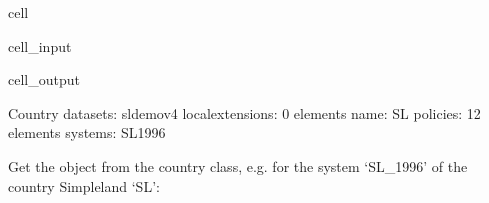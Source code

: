 \documentclass[letterpaper,10pt,english]{sphinxmanual}
\begin{document}
\begin{sphinxuseclass}{cell}
\begin{sphinxuseclass}{cell_input}
\begin{sphinxVerbatim}[commandchars=\\\{\}]
\PYG{p}{[}\PYG{p}{]}
\end{sphinxVerbatim}

\end{sphinxuseclass}
\begin{sphinxuseclass}{cell_output}
\begin{sphinxVerbatim}[commandchars=\\\{\}]
\PYGZhy{}\PYGZhy{}\PYGZhy{}\PYGZhy{}\PYGZhy{}\PYGZhy{}\PYGZhy{}\PYGZhy{}\PYGZhy{}\PYGZhy{}\PYGZhy{}\PYGZhy{}\PYGZhy{}\PYGZhy{}\PYGZhy{}\PYGZhy{}\PYGZhy{}\PYGZhy{}\PYGZhy{}\PYGZhy{}\PYGZhy{}\PYGZhy{}\PYGZhy{}\PYGZhy{}\PYGZhy{}\PYGZhy{}\PYGZhy{}\PYGZhy{}\PYGZhy{}\PYGZhy{}
Country
\PYGZhy{}\PYGZhy{}\PYGZhy{}\PYGZhy{}\PYGZhy{}\PYGZhy{}\PYGZhy{}\PYGZhy{}\PYGZhy{}\PYGZhy{}\PYGZhy{}\PYGZhy{}\PYGZhy{}\PYGZhy{}\PYGZhy{}\PYGZhy{}\PYGZhy{}\PYGZhy{}\PYGZhy{}\PYGZhy{}\PYGZhy{}\PYGZhy{}\PYGZhy{}\PYGZhy{}\PYGZhy{}\PYGZhy{}\PYGZhy{}\PYGZhy{}\PYGZhy{}\PYGZhy{}
	 datasets: sl\PYGZus{}demo\PYGZus{}v4
	 local\PYGZus{}extensions: 0 elements
	 name: \PYGZsq{}SL\PYGZsq{}
	 policies: 12 elements
	 systems: SL\PYGZus{}1996
\end{sphinxVerbatim}

\end{sphinxuseclass}
\end{sphinxuseclass}
\sphinxAtStartPar
Get the  object from the country class, e.g. for the system ‘SL\_1996’ of the country Simpleland ‘SL’:
\end{document}
